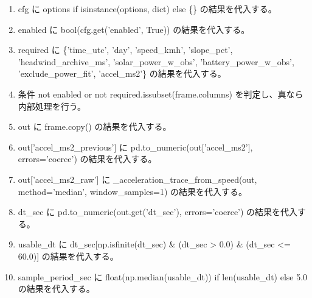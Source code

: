 \documentclass[a4paper,11pt]{article}
\begin{document}
            \begin{enumerate}[leftmargin=1.8em]
            \item cfg に options if isinstance(options, dict) else \{\} の結果を代入する。
\item enabled に bool(cfg.get('enabled', True)) の結果を代入する。
\item required に \{'time\_utc', 'day', 'speed\_kmh', 'slope\_pct', 'headwind\_archive\_ms', 'solar\_power\_w\_obs', 'battery\_power\_w\_obs', 'exclude\_power\_fit', 'accel\_ms2'\} の結果を代入する。
\item 条件 not enabled or not required.issubset(frame.columns) を判定し、真なら内部処理を行う。
\item out に frame.copy() の結果を代入する。
\item out['accel\_ms2\_previous'] に pd.to\_numeric(out['accel\_ms2'], errors='coerce') の結果を代入する。
\item out['accel\_ms2\_raw'] に \_acceleration\_trace\_from\_speed(out, method='median', window\_samples=1) の結果を代入する。
\item dt\_sec に pd.to\_numeric(out.get('dt\_sec'), errors='coerce') の結果を代入する。
\item usable\_dt に dt\_sec[np.isfinite(dt\_sec) \& (dt\_sec > 0.0) \& (dt\_sec <= 60.0)] の結果を代入する。
\item sample\_period\_sec に float(np.median(usable\_dt)) if len(usable\_dt) else 5.0 の結果を代入する。
            \end{enumerate}
\end{document}
